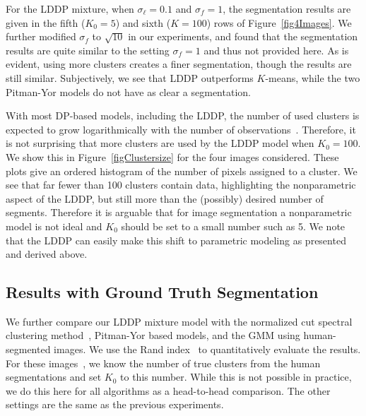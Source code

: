 \documentclass[runningheads,a4paper]{iscide}
\begin{document}
For the LDDP mixture, when $\sigma_{\ell}=0.1$ and $\sigma_{f}=1$,
the segmentation results
are given in the fifth ($K_0 = 5$) and sixth ($K=100$) rows of Figure~\ref{fig4Images}. We further modified $\sigma_{f}$ to $\sqrt{10}$ in
our experiments, and found that the segmentation results are quite similar to
the setting $\sigma_{f}=1$ and thus not provided here. As is evident, using more clusters creates a finer segmentation, though the results are still similar. Subjectively, we see that LDDP outperforms $K$-means, while the two Pitman-Yor models do not have as clear a segmentation.










With most DP-based models, including the LDDP, the number of used clusters is expected to grow logarithmically with the number of observations~\cite{Teh10DP}. Therefore, it is not surprising that more clusters are used by the LDDP model when $K_0 =100$. We show this in Figure~\ref{figClustersize} for the four images considered. These plots give an ordered histogram of the number of pixels assigned to a cluster. We see that far fewer than 100 clusters contain data, highlighting the nonparametric aspect of the LDDP, but still more than the (possibly) desired number of segments. Therefore it is arguable that for image segmentation a nonparametric model is not ideal and $K_0$ should be set to a small number such as 5. We note that the LDDP can easily make this shift to parametric modeling as presented and derived above.

\subsection{Results with Ground Truth Segmentation}

We further compare our LDDP mixture model with the normalized cut
spectral clustering method~\cite{Shi00NC}, Pitman-Yor based models, and the GMM
using human-segmented images. We use the Rand
index~\cite{Unni07toe} to quantitatively evaluate the results. For
these images~\cite{Oliva01MS}, we know the number of true clusters
from the human segmentations and set $K_0$ to this number. While this is not possible in practice, we do this here for all algorithms as a head-to-head comparison. The
other settings are the same as the previous experiments.
\end{document}
